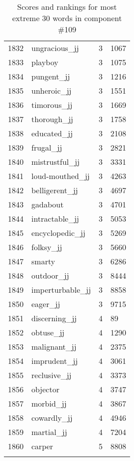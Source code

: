 \begin{longtable}[!htbp]{| rlr@{.}l |}
    1832 & ungracious\_jj & 3 & 1067 \\
    1833 & playboy & 3 & 1075 \\
    1834 & pungent\_jj & 3 & 1216 \\
    1835 & unheroic\_jj & 3 & 1551 \\
    1836 & timorous\_jj & 3 & 1669 \\
    1837 & thorough\_jj & 3 & 1758 \\
    1838 & educated\_jj & 3 & 2108 \\
    1839 & frugal\_jj & 3 & 2821 \\
    1840 & mistrustful\_jj & 3 & 3331 \\
    1841 & loud-mouthed\_jj & 3 & 4263 \\
    1842 & belligerent\_jj & 3 & 4697 \\
    1843 & gadabout & 3 & 4701 \\
    1844 & intractable\_jj & 3 & 5053 \\
    1845 & encyclopedic\_jj & 3 & 5269 \\
    1846 & folksy\_jj & 3 & 5660 \\
    1847 & smarty & 3 & 6286 \\
    1848 & outdoor\_jj & 3 & 8444 \\
    1849 & imperturbable\_jj & 3 & 8858 \\
    1850 & eager\_jj & 3 & 9715 \\
    1851 & discerning\_jj & 4 & 89 \\
    1852 & obtuse\_jj & 4 & 1290 \\
    1853 & malignant\_jj & 4 & 2375 \\
    1854 & imprudent\_jj & 4 & 3061 \\
    1855 & reclusive\_jj & 4 & 3373 \\
    1856 & objector & 4 & 3747 \\
    1857 & morbid\_jj & 4 & 3867 \\
    1858 & cowardly\_jj & 4 & 4946 \\
    1859 & martial\_jj & 4 & 7204 \\
    1860 & carper & 5 & 8808 \\
    \hline
    \caption{Scores and rankings for most extreme 30 words in component \#109} \\
\end{longtable}
